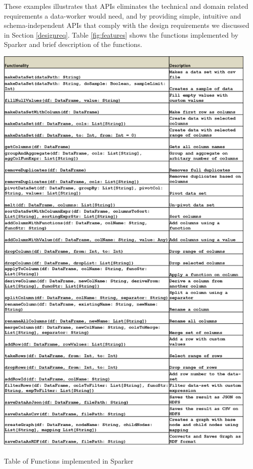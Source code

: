 These examples illustrates that APIs eliminates the technical and domain related requirements a data-worker would need, and by providing simple, intuitive and schema-independent APIs that comply with the design requirements we discussed in Section \ref{designreq}. 
Table \ref{fig:features} shows the functions implemented by Sparker and brief description of the functions. 
\begin{center}
	\includegraphics[width=35em]{./Figures/Picture2}
	\begin{table}[htbp]
    \caption{Table of Functions implemented in Sparker}
    \label{fig:features}
	\end{table}
\end{center}
